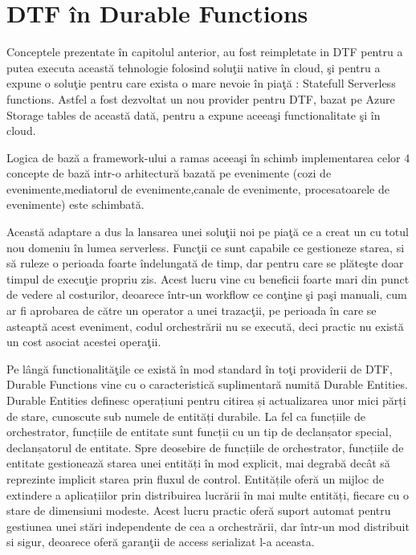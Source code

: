 \documentclass[a4paper,12pt]{report}
\begin{document}
\section{DTF în Durable Functions} 
\quad Conceptele prezentate în capitolul anterior, au fost reimpletate in DTF pentru a putea executa această tehnologie folosind soluţii native în cloud, şi pentru a expune o soluţie pentru care exista o mare nevoie în piaţă : Statefull Serverless functions. Astfel a fost dezvoltat un nou provider pentru DTF, bazat pe Azure Storage tables de această dată, pentru a expune aceeaşi functionalitate şi în cloud. 
\par Logica de bază a framework-ului a ramas aceeaşi în schimb implementarea celor 4 concepte de bază intr-o arhitectură bazată pe evenimente (cozi de evenimente,mediatorul de evenimente,canale de evenimente, procesatoarele de evenimente) este schimbată.
\par Această adaptare a dus la lansarea unei soluţii noi pe piaţă ce a creat un cu totul nou domeniu în lumea serverless. Funcţii ce sunt capabile ce gestioneze starea, si să ruleze o perioada foarte îndelungată de timp, dar pentru care se plăteşte doar timpul de execuţie propriu zis. Acest lucru vine cu beneficii foarte mari din punct de vedere al costurilor, deoarece într-un workflow ce conţine şi paşi manuali, cum ar fi aprobarea de către un operator a unei trazacţii, pe perioada în care se asteaptă acest eveniment, codul orchestrării nu se execută, deci practic nu există un cost asociat acestei operaţii. 
\par Pe lângă functionalităţile ce există în mod standard în toţi providerii de DTF, Durable Functions vine cu o caracteristică suplimentară numită Durable Entities. Durable Entities definesc operațiuni pentru citirea și actualizarea unor mici părți de stare, cunoscute sub numele de entități durabile. La fel ca funcțiile de orchestrator, funcțiile de entitate sunt funcții cu un tip de declanșator special, declanșatorul de entitate. Spre deosebire de funcțiile de orchestrator, funcțiile de entitate gestionează starea unei entități în mod explicit, mai degrabă decât să reprezinte implicit starea prin fluxul de control. Entitățile oferă un mijloc de extindere a aplicațiilor prin distribuirea lucrării în mai multe entități, fiecare cu o stare de dimensiuni modeste. Acest lucru practic oferă suport automat pentru gestiunea unei stări independente de cea a orchestrării, dar într-un mod distribuit si sigur, deoarece oferă garanţii de access serializat l-a aceasta. 
\end{document}

